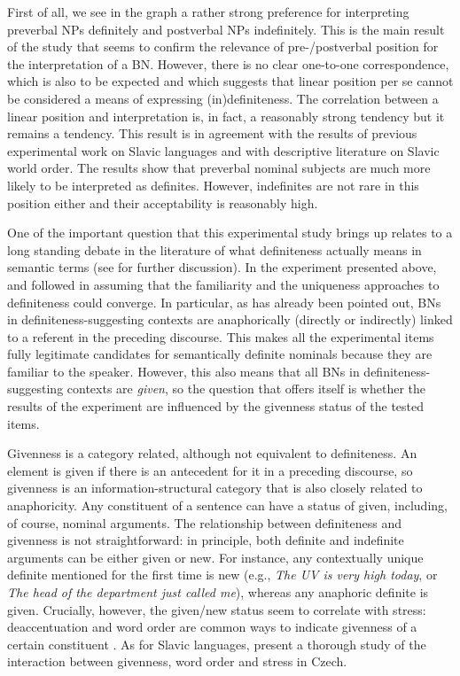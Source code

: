 \documentclass[output=paper,colorlinks,citecolor=brown]{langscibook}
\begin{document}
First of all, we see in the graph a rather strong preference for interpreting preverbal NPs definitely and postverbal NPs indefinitely. This is the main result of the study that seems to confirm the relevance of pre-/postverbal position for the interpretation of a BN. However, there is no clear one-to-one correspondence, which is also to be expected and which suggests that  linear position per se cannot be considered a means of expressing (in)definiteness. The correlation between a linear position and interpretation is, in fact, a reasonably strong tendency but it remains a tendency. This result is in agreement with the results of previous experimental work on Slavic languages \citep[cf.][]{czardybonetal14, simik-burianova20} and with descriptive literature on Slavic world order. The results show that preverbal nominal subjects are much more likely to be interpreted as definites. However, indefinites are not rare in this position either and their acceptability is reasonably high. 

One of the important question that this experimental study brings up relates to a long standing debate in the literature of what definiteness actually means in semantic terms (see  for further discussion). In the experiment presented above, \citet{seresetal} and \citet{Borik.etal2020} followed \citet{Farkas2002} in assuming that the familiarity and the uniqueness approaches to definiteness could converge. In particular, as has already been pointed out, BNs in definiteness-suggesting contexts are anaphorically (directly or indirectly) linked to a referent in the preceding discourse. This makes all the experimental items fully legitimate candidates for semantically definite nominals because they are familiar to the speaker. However, this also means that all BNs in definiteness-suggesting contexts are \textit{given}, so the question that offers itself is whether the results of the experiment are influenced by the givenness status of the tested items. 

Givenness is a category related, although not equivalent to definiteness. An element is given if there is an antecedent for it in a preceding discourse, so givenness is an information-structural category that is also closely related to anaphoricity. Any constituent of a sentence can have a status of given, including, of course, nominal arguments. 
The relationship between definiteness and givenness is not straightforward: in principle, both definite and indefinite arguments can be either given or new. For instance, any contextually unique definite mentioned for the first time is new (e.g., \textit{The UV is very high today}, or \textit{The head of the department just called me}), whereas any anaphoric definite is given. Crucially, however, the given/new status seem to correlate with stress: deaccentuation and word order are common ways to indicate givenness of a certain constituent \citep[cf.][]{krifka08}.  As for Slavic languages, \citet{simikwierzba15} present a thorough study of the interaction between givenness, word order and stress in Czech. 
\end{document}
